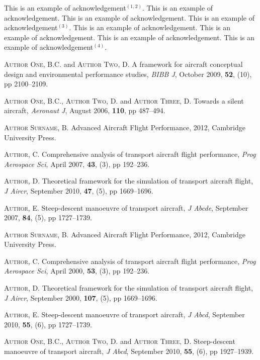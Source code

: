 \documentclass{jpp}
\begin{document}
This is an example of acknowledgement$^{(1,2)}$. This is an example of acknowledgement. This
is an example of acknowledgement. This is an example of acknowledgement$^{(3)}$. This is an
example of acknowledgement. This is an example of acknowledgement. This is an example
of acknowledgement. This is an example of acknowledgement$^{(4)}$.

\begin{thebibliography}

\bibitem{}
\textsc{Author One}, B.C. and \textsc{Author Two}, D. A framework for aircraft conceptual design and
environmental performance studies, \textit{BIBB J}, October 2009, \textbf{52}, (10), pp 2100--2109.

\bibitem{}
\textsc{Author One}, B.C., \textsc{Author Two}, D. and \textsc{Author Three}, D. Towards a silent aircraft,
\textit{Aeronaut J}, August 2006, \textbf{110}, pp 487--494.

\bibitem{}
\textsc{Author Surname}, B. Advanced Aircraft Flight Performance, 2012, Cambridge University
Press.

\bibitem{}
\textsc{Author, C}. Comprehensive analysis of transport aircraft flight performance, \textit{Prog
Aerospace Sci}, April 2007, \textbf{43}, (3), pp 192--236.

\bibitem{}
\textsc{Author, D}. Theoretical framework for the simulation of transport aircraft flight, \textit{J Aircr},
September 2010, \textbf{47}, (5), pp 1669--1696.

\bibitem{}
\textsc{Author, E}. Steep-descent manoeuvre of transport aircraft, \textit{J Abcde}, September 2007,
\textbf{84}, (5), pp 1727--1739.

\bibitem{}
\textsc{Author Surname}, B. Advanced Aircraft Flight Performance, 2012, Cambridge University
Press.

\bibitem{}
\textsc{Author, C}. Comprehensive analysis of transport aircraft flight performance, \textit{Prog
Aerospace Sci}, April 2000, \textbf{53}, (3), pp 192--236.

\bibitem{}
\textsc{Author}, D. Theoretical framework for the simulation of transport aircraft flight, \textit{J Aircr},
September 2000, \textbf{107}, (5), pp 1669--1696.

\bibitem{}
\textsc{Author, E}. Steep-descent manoeuvre of transport aircraft, \textit{J Abcd}, September 2010, \textbf{55},
(6), pp 1727--1739.

\bibitem{}
\textsc{Author One}, B.C., \textsc{Author Two}, D. and \textsc{Author Three}, D. Steep-descent manoeuvre
of transport aircraft, \textit{J Abcd}, September 2010, \textbf{55}, (6), pp 1927--1939.

\end{thebibliography}
\end{document}
